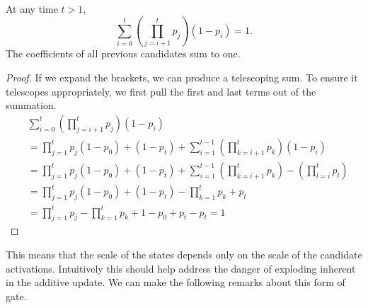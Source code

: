 \begin{prop} 
At any time \(t > 1\),
\begin{equation} \label{eq:cvexforward}
	\sum_{i=0}^t \left(\prod_{j=i+1}^t p_j\right) (1 - p_i) = 1.
\end{equation}
The coefficients of all previous candidates sum to one.
\label{prop:convexsum}
\end{prop}
\begin{proof}
If we expand the brackets, we can produce a telescoping sum. To ensure it telescopes
appropriately, we first pull the first and last terms out of the summation.
\begin{align}
    &\sum_{i=0}^t \left(\prod_{j=i+1}^t p_j\right) (1 - p_i) \\
    &= \prod_{j=1}^tp_j(1-p_0) + (1-p_t) + \sum_{i=1}^{t-1} \left(\prod_{k=i+1}^t p_k\right) (1 - p_i) \\
    &= \prod_{j=1}^tp_j(1-p_0) + (1-p_t) + \sum_{i=1}^{t-1} \left(\prod_{k=i+1}^t p_k\right) - \left(\prod_{l=i}^t p_l\right) \\
    &= \prod_{j=1}^tp_j(1-p_0) + (1-p_t) - \prod_{k=1}^t p_k + p_t \\
    &= \prod_{j=1}^tp_j - \prod_{k=1}^tp_k + 1 - p_0 + p_t - p_t = 1
\end{align}
\end{proof}
This means that the scale of the states
depends only on the scale of the candidate activations. Intuitively this should help address the danger
of exploding inherent in the additive update. We can make the following remarks about this form
of gate.

